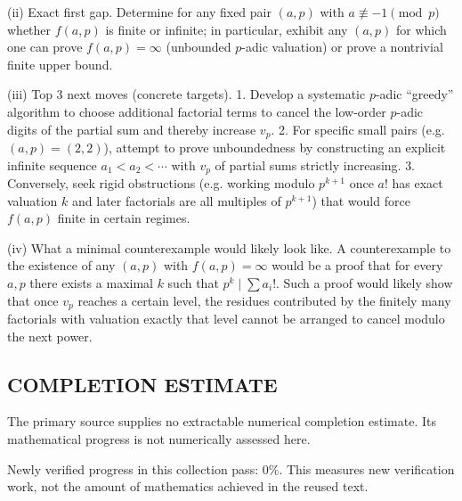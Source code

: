 (ii) Exact first gap.
Determine for any fixed pair $(a,p)$ with $a\not\equiv -1\pmod p$ whether $f(a,p)$ is finite or infinite; in particular, exhibit any $(a,p)$ for which one can prove $f(a,p)=\infty$ (unbounded $p$-adic valuation) or prove a nontrivial finite upper bound.

(iii) Top 3 next moves (concrete targets).
1. Develop a systematic $p$-adic “greedy” algorithm to choose additional factorial terms to cancel the low-order $p$-adic digits of the partial sum and thereby increase $v_p$.
2. For specific small pairs (e.g. $(a,p)=(2,2)$), attempt to prove unboundedness by constructing an explicit infinite sequence $a_1<a_2<\cdots$ with $v_p$ of partial sums strictly increasing.
3. Conversely, seek rigid obstructions (e.g. working modulo $p^{k+1}$ once $a!$ has exact valuation $k$ and later factorials are all multiples of $p^{k+1}$) that would force $f(a,p)$ finite in certain regimes.

(iv) What a minimal counterexample would likely look like.
A counterexample to the existence of any $(a,p)$ with $f(a,p)=\infty$ would be a proof that for every $a,p$ there exists a maximal $k$ such that $p^k\mid\sum a_i!$. Such a proof would likely show that once $v_p$ reaches a certain level, the residues contributed by the finitely many factorials with valuation exactly that level cannot be arranged to cancel modulo the next power.




\subsection*{COMPLETION ESTIMATE}
The primary source supplies no extractable numerical completion estimate. Its mathematical progress is not numerically assessed here.

Newly verified progress in this collection pass: $0\%$. This measures new verification work, not the amount of mathematics achieved in the reused text.
